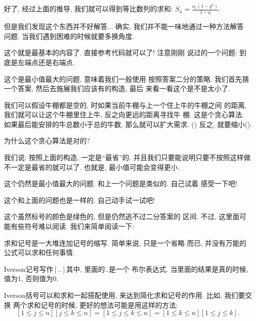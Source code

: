 好了, 经过上面的推导, 我们就可以得到等比数列的求和: $S_n=\frac{a_1(1-q^n)}{1-q}$.


但是我们发现这个东西并不好解答... 确实, 我们并不能一味地通过一种方法解答
问题. 当我们遇到困难的时候就要多换角度. 

 这个就是最基本的内容了. 直接参考代码就可以了! 注意刚刚
说过的一个问题: 到底是左端点还是右端点. 


 这个是最小值最大的问题, 意味着我们一般使用
按照答案二分的策略. 我们首先猜一个答案, 然后去施展我们应该有的构造, 最后
来看一看这个是不是太小了. 

我们可以假设牛棚都是空的, 时如果当前牛棚与上一个住上牛的牛棚之间
的距离, 我们就可以让这个牛棚里住上牛, 反之向更远的距离寻找牛
棚. 这是个贪心算法. 如果最后能安排的牛总数小于总的牛数, 那么就可以扩大需求. 
() 
反之, 就要缩小(). 

\begin{ques}
    为什么这个贪心算法是对的? 
\end{ques}

我们说: 按照上面的构造, 一定是``最省''的. 并且我们只要能说明只要不按照这样做
不一定是最省的就可以了. 也就是, 最小值可能会变得更小. 

  这个仍然是最小值最大的问题. 和上一个问题是类似的. 自己试着
感受一下吧! 

 这个和上面的问题也是一样的. 自己动手试一试吧!  

 这个虽然标号的颜色是绿色的, 但是仍然逃不过二分答案的
区间. 不过, 这里面可能有些符号难以阅读. 我们来简单阅读一下: 

 求和记号是一大堆连加记号的缩写. 简单来说, 只是一个省略
而已, 并没有万能的公式可以求和任何事情. 

 Iverson记号写作$[..]$其中, 里面的$..$是一个
布尔表达式. 当里面的结果是真的时候, 值为1, 否则值为0. 

Iverson括号可以和求和一起搭配使用, 来达到简化求和记号的作用. 比如, 我们要交换
两个求和记号的时候, 更好的想法可能是用这样的方法: 
$$
[1\leq j\leq n][j\leq k \leq n]=[1\leq j \leq k \leq n] = 
[1\leq k\leq n][1\leq j\leq k]. 
$$

